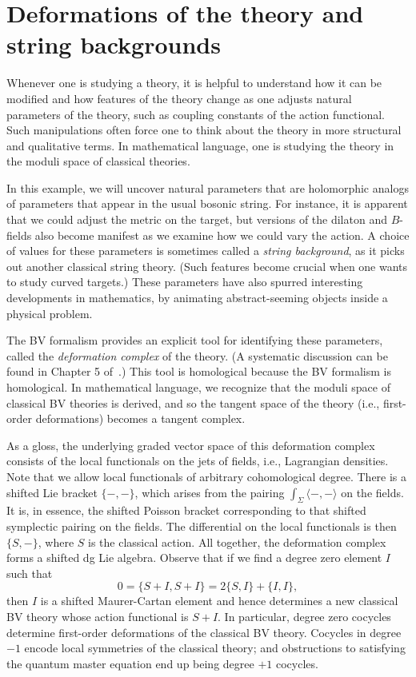 \section{Deformations of the theory and string backgrounds}
\label{sec: moduli}

\def\wt{{\rm wt}}

Whenever one is studying a theory,
it is helpful to understand how it can be modified 
and how features of the theory change as one adjusts natural parameters of the theory,
such as coupling constants of the action functional.
Such manipulations often force one to think about the theory in more structural and qualitative terms.
In mathematical language, one is studying the theory in the moduli space of classical theories.

In this example, we will uncover natural parameters that are holomorphic analogs of parameters that appear in the usual bosonic string.
For instance, it is apparent that we could adjust the metric on the target,
but versions of the dilaton and $B$-fields also become manifest as we examine how we could vary the action.
A choice of values for these parameters is sometimes called a {\em string background},
as it picks out another classical string theory.
(Such features become crucial when one wants to study curved targets.)
These parameters have also spurred interesting developments in mathematics,
by animating abstract-seeming objects inside a physical problem.

The BV formalism provides an explicit tool for identifying these parameters,
called the {\em deformation complex} of the theory.
(A systematic discussion can be found in Chapter 5 of~\cite{CosBook}.)
This tool is homological because the BV formalism is homological.
In mathematical language, we recognize that the moduli space of classical BV theories is derived,
and so the tangent space of the theory (i.e., first-order deformations) becomes a tangent complex.

As a gloss, the underlying graded vector space of this deformation complex consists of the local functionals on the jets of fields, i.e., Lagrangian densities.
Note that we allow local functionals of arbitrary cohomological degree. 
There is a shifted Lie bracket $\{-,-\}$, 
which arises from the pairing $\int_\Sigma \langle-,-\rangle$ on the fields.
It is, in essence, the shifted Poisson bracket corresponding to that shifted symplectic pairing on the fields.
The differential on the local functionals is then $\{S,-\}$, where $S$ is the classical action. 
All together, the deformation complex forms a shifted dg Lie algebra. 
Observe that if we find a degree zero element $I$ such that
\[
0=\{S +I,S +I\}=2\{S,I\}+\{I,I\},
\]
then $I$ is a shifted Maurer-Cartan element and 
hence determines a new classical BV theory whose action functional is $S + I$. 
In particular, degree zero cocycles determine first-order deformations of the classical BV theory. 
Cocycles in degree~$-1$ encode local symmetries of the classical theory; 
and obstructions to satisfying the quantum master equation end up being degree $+1$ cocycles.

